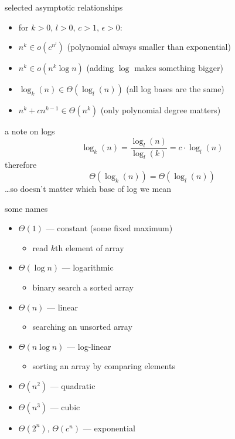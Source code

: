 

\begin{frame}{selected asymptotic relationships}
\begin{itemize}
\item for $k>0$, $l>0$, $c>1$, $\epsilon>0$:
\item $n^k \in o(c^{n^l})$ (polynomial always smaller than exponential)
\item $n^k \in o(n^k \log n)$ (adding $\log$ makes something bigger)
\item $\log_k(n) \in \Theta(\log_l(n))$ (all log bases are the same)
\item $n^k+cn^{k-1} \in \Theta(n^k)$ (only polynomial degree matters)
\end{itemize}
\end{frame}

\begin{frame}{a note on logs}
\[
    \log_k(n) = \frac{\log_l(n)}{\log_l(k)} = c \cdot \log_l(n)
\]
therefore
\[
    \Theta(\log_k(n)) = \Theta(\log_l(n))
\]
\ldots so doesn't matter which base of log we mean
\end{frame}

\begin{frame}{some names}
\begin{itemize}
\item $\Theta(1)$ --- constant (some fixed maximum)
    \begin{itemize}
    \item read $k$th element of array
    \end{itemize}
\item $\Theta(\log n)$ --- logarithmic
    \begin{itemize}
    \item binary search a sorted array
    \end{itemize}
\item $\Theta(n)$ --- linear
    \begin{itemize}
    \item searching an unsorted array
    \end{itemize}
\item $\Theta(n\log n)$ --- log-linear
    \begin{itemize}
    \item sorting an array by comparing elements
    \end{itemize}
\item $\Theta(n^2)$ --- quadratic
\item $\Theta(n^3)$ --- cubic
\item $\Theta(2^n)$, $\Theta(c^n)$ --- exponential
\end{itemize}
\end{frame}
